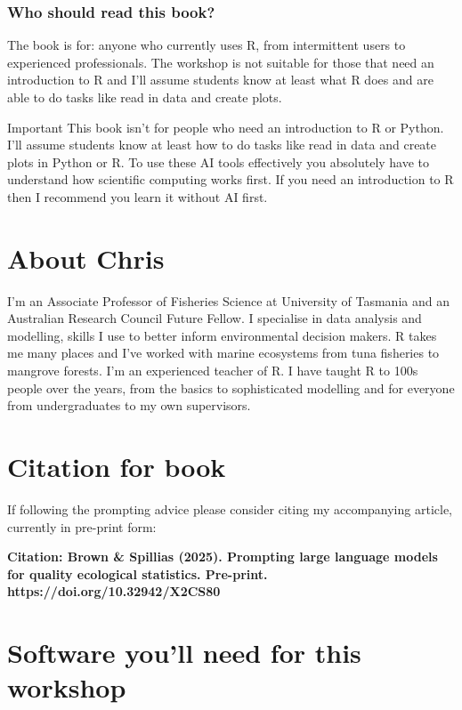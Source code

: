 \documentclass[
  letterpaper,
  DIV=11,
  numbers=noendperiod]{scrreprt}
\begin{document}
\subsubsection{Who should read this
book?}\label{who-should-read-this-book}

The book is for: anyone who currently uses R, from intermittent users to
experienced professionals. The workshop is not suitable for those that
need an introduction to R and I'll assume students know at least what R
does and are able to do tasks like read in data and create plots.

Important This book isn't for people who need an introduction to R or
Python. I'll assume students know at least how to do tasks like read in
data and create plots in Python or R. To use these AI tools effectively
you absolutely have to understand how scientific computing works first.
If you need an introduction to R then I recommend you learn it without
AI first.

\section{About Chris}\label{about-chris}

I'm an Associate Professor of Fisheries Science at University of
Tasmania and an Australian Research Council Future Fellow. I specialise
in data analysis and modelling, skills I use to better inform
environmental decision makers. R takes me many places and I've worked
with marine ecosystems from tuna fisheries to mangrove forests. I'm an
experienced teacher of R. I have taught R to 100s people over the years,
from the basics to sophisticated modelling and for everyone from
undergraduates to my own supervisors.

\section{Citation for book}\label{citation-for-book}

If following the prompting advice please consider citing my accompanying
article, currently in pre-print form:

\textbf{Citation: Brown \& Spillias (2025). Prompting large language
models for quality ecological statistics. Pre-print.
https://doi.org/10.32942/X2CS80}

\section{Software you'll need for this
workshop}\label{software-youll-need-for-this-workshop}
\end{document}
